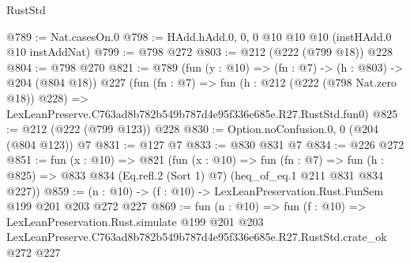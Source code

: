 \begin{lexlean}{RustStd}
\begin{coremodule}
@789 := Nat.casesOn.{0}
@798 := HAdd.hAdd.{0, 0, 0} @10 @10 @10 (instHAdd.{0} @10 instAddNat)
@799 := @798 @272
@803 := @212 (@222 (@799 @18)) @228
@804 := @798 @270
@821 := @789
    (fun (y : @10) => (fn : @7) -> (h : @803) -> @204 (@804 @18))
    @227
    (fun (fn : @7) =>
    fun (h : @212 (@222 (@798 Nat.zero @18)) @228) =>
    LexLeanPreserve.C763ad8b782b549b787d4e95f336e685e.R27.RustStd.fun0)
@825 := @212 (@222 (@799 @123)) @228
@830 := Option.noConfusion.{0, 0} (@204 (@804 @123)) @7
@831 := @127 @7
@833 := @830 @831 @7
@834 := @226 @272
@851 := fun (x : @10) =>
  @821
    (fun (x : @10) =>
    fun (fn : @7) =>
    fun (h : @825) => @833 @834 (Eq.refl.{2} (Sort 1) @7) (heq_of_eq.{1} @211 @831 @834 @227))
@859 := (n : @10) -> (f : @10) -> LexLeanPreservation.Rust.FunSem @199 @201 @203 @272 @227
@869 := fun (n : @10) =>
  fun (f : @10) =>
  LexLeanPreservation.Rust.simulate
    @199
    @201
    @203
    LexLeanPreserve.C763ad8b782b549b787d4e95f336e685e.R27.RustStd.crate_ok
    @272
    @227
\end{coremodule}
\end{lexlean}

